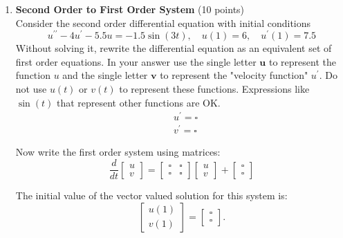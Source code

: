 \begin{enumerate}
  \item \textbf{Second Order to First Order System} (10 points)\\
  Consider the second order differential equation with initial conditions
  $$
  u^{\prime \prime}-4 u^{\prime}-5.5 u=-1.5 \sin (3 t), \quad u(1)=6, \quad u^{\prime}(1)=7.5
  $$
  Without solving it, rewrite the differential equation as an equivalent set of first order equations. In your answer use the single letter $\mathbf{u}$ to represent the function $u$ and the single letter $\mathbf{v}$ to represent the "velocity function" $u^{\prime}$. Do not use $u(t)$ or $v(t)$ to represent these functions. Expressions like $\sin (t)$ that represent other functions are OK.
  $$
  \begin{aligned}
  & u^{\prime}=\square \\
  & v^{\prime}=\square
  \end{aligned}
  $$
  \begin{subanswer}
  \end{subanswer}
  Now write the first order system using matrices:
  \[
  \frac{d}{dt}\left[\begin{array}{l} u \\ v \end{array}\right]=\left[\begin{array}{rr} \square & \square \\ \square & \square \end{array}\right]\left[\begin{array}{l} u \\ v \end{array}\right]+\left[\begin{array}{l} \square \\ \square \end{array}\right]
  \]
  \begin{subanswer}
  \end{subanswer}
  The initial value of the vector valued solution for this system is:
  \[
  \left[\begin{array}{l} u(1) \\ v(1) \end{array}\right]=\left[\begin{array}{l} \square \\ \square \end{array}\right].
  \]
  \begin{subanswer}
  \end{subanswer}


\end{enumerate}
